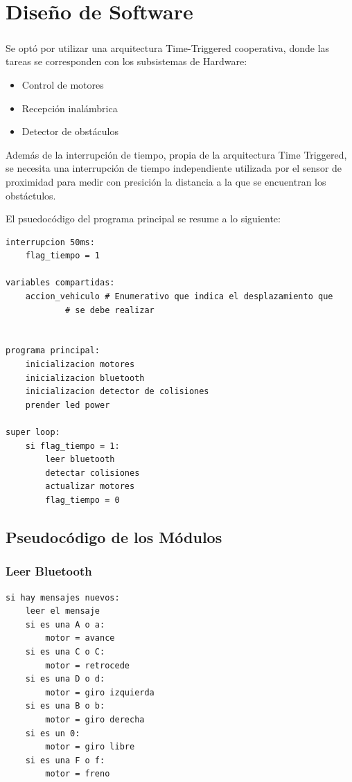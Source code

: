 \chapter{Diseño de Software}

\paragraph{}
Se optó por utilizar una arquitectura Time-Triggered cooperativa, donde
las tareas se corresponden con los subsistemas de Hardware:

\begin{itemize}
	\item
	Control de motores
	\item
	Recepción inalámbrica
	\item
	Detector de obstáculos
\end{itemize}

Además de la interrupción de tiempo, propia de la arquitectura Time
Triggered, se necesita una interrupción de tiempo independiente
utilizada por el sensor de proximidad para medir con presición la
distancia a la que se encuentran los obstáctulos.

El psuedocódigo del programa principal se resume a lo siguiente:

\begin{Verbatim}
interrupcion 50ms:
	flag_tiempo = 1

variables compartidas:
	accion_vehiculo # Enumerativo que indica el desplazamiento que
			# se debe realizar


programa principal:
	inicializacion motores
	inicializacion bluetooth
	inicializacion detector de colisiones
	prender led power

super loop:
	si flag_tiempo = 1:
		leer bluetooth
		detectar colisiones
		actualizar motores
		flag_tiempo = 0
\end{Verbatim}


\section{Pseudocódigo de los Módulos}

\subsection{Leer Bluetooth}

\begin{Verbatim}
si hay mensajes nuevos:
	leer el mensaje
	si es una A o a:
		motor = avance
	si es una C o C:
		motor = retrocede
	si es una D o d:
		motor = giro izquierda
	si es una B o b:
		motor = giro derecha
	si es un 0:
		motor = giro libre
	si es una F o f:
		motor = freno
\end{Verbatim}


